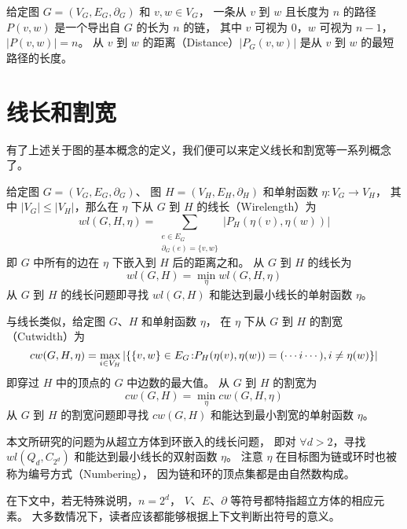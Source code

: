 给定图 $G = (V_G, E_G, \partial_G)$ 和 $v, w \in V_G$，
一条从 $v$ 到 $w$ 且长度为 $n$ 的路径 $P(v, w)$ 是一个导出自 $G$ 的长为 $n$ 的链，
其中 $v$ 可视为 $0$，$w$ 可视为 $n - 1$，$|P(v, w)| = n$。
从 $v$ 到 $w$ 的距离（Distance）$|P_G(v, w)|$ 是从 $v$ 到 $w$ 的最短路径的长度。

\section{线长和割宽}
\label{Section 2.2}

有了上述关于图的基本概念的定义，我们便可以来定义线长和割宽等一系列概念了。

给定图 $G = (V_G, E_G, \partial_G)$、
图 $H = (V_H, E_H, \partial_H)$ 和单射函数 $\eta \colon V_G \rightarrow V_H$，
其中 $|V_G| \le |V_H|$，那么在 $\eta$ 下从 $G$ 到 $H$ 的线长（Wirelength）为
\begin{equation*}
wl(G, H, \eta) = \sum_{\substack{
	e \in E_G \\
	\partial_G(e) = \{v, w\}
}} |P_H(\eta(v), \eta(w))|
\end{equation*}
即 $G$ 中所有的边在 $\eta$ 下嵌入到 $H$ 后的距离之和。
从 $G$ 到 $H$ 的线长为
\begin{equation*}
wl(G, H) = \min_{\eta} wl(G, H, \eta)
\end{equation*}
从 $G$ 到 $H$ 的线长问题即寻找 $wl(G, H)$ 和能达到最小线长的单射函数 $\eta$。

与线长类似，给定图 $G$、$H$ 和单射函数 $\eta$，
在 $\eta$ 下从 $G$ 到 $H$ 的割宽（Cutwidth）为
\begin{equation*}
cw(G, H, \eta) = \max_{i \in V_H} |\{\{v, w\} \in E_G \colon \\
P_H(\eta(v), \eta(w)) = (\cdots i \cdots), i \neq \eta(w)\}|
\end{equation*}
即穿过 $H$ 中的顶点的 $G$ 中边数的最大值。
从 $G$ 到 $H$ 的割宽为
\begin{equation*}
cw(G, H) = \min_{\eta} cw(G, H, \eta)
\end{equation*}
从 $G$ 到 $H$ 的割宽问题即寻找 $cw(G, H)$ 和能达到最小割宽的单射函数 $\eta$。

本文所研究的问题为从超立方体到环嵌入的线长问题，
即对 $\forall d > 2$，寻找 $wl(Q_d, C_{2^d})$ 和能达到最小线长的双射函数 $\eta$。
注意 $\eta$ 在目标图为链或环时也被称为编号方式（Numbering），
因为链和环的顶点集都是由自然数构成。

在下文中，若无特殊说明，$n = 2^d$，
$V$、$E$、$\partial$ 等符号都特指超立方体的相应元素。
大多数情况下，读者应该都能够根据上下文判断出符号的意义。

